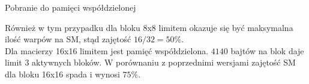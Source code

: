 \begin{enumerate}[(a)]
\begin{minipage}[c]{\textwidth}
\end{minipage}

\begin{minipage}[c]{\textwidth}

\item Pobranie do pamięci współdzielonej

\begin{center}
\begin{table}[H]
\centering
{}
\caption{Teoretyczna zajętość SM -- wersja 4. z pobraniem do pamięci współdzielonej.}
\end{table}
\end{center}

Również w tym przypadku dla bloku 8x8 limitem okazuje się być maksymalna ilość warpów na SM, stąd zajętość $ 16 / 32 = 50\% $. \\
Dla macierzy 16x16 limitem jest pamięć współdzielona. $4140$ bajtów na blok daje limit $3$ aktywnych bloków. W porównaniu z poprzednimi wersjami zajętość SM dla bloku 16x16 spada i wynosi $ 75\% $. \\

\end{minipage}

\end{enumerate}

